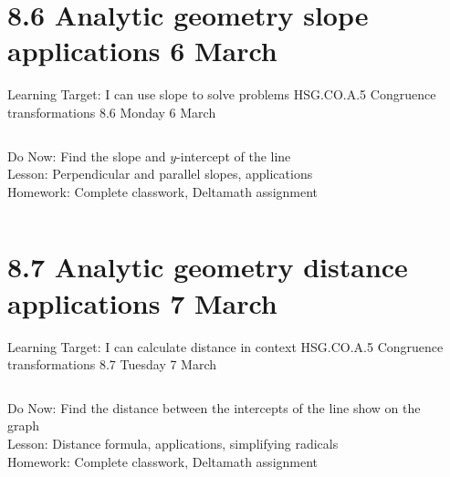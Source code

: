 \section{8.6 Analytic geometry slope applications \hfill 6 March \,}
\begin{frame}{Learning Target: I can use slope to solve problems}
  {HSG.CO.A.5 Congruence transformations \hfill \alert{8.6 Monday 6 March}}
  \begin{columns}
    Do Now: Find the slope and $y$-intercept of the line \\[0.5cm]
    Lesson: Perpendicular and parallel slopes, applications \\
    Homework: Complete classwork, Deltamath assignment
    \begin{flushright}
    \end{flushright}
  \end{columns}
\end{frame}

\section{8.7 Analytic geometry distance applications \hfill 7 March \,}
\begin{frame}{Learning Target: I can calculate distance in context}
  {HSG.CO.A.5 Congruence transformations \hfill \alert{8.7 Tuesday 7 March}}
  \begin{columns}
    Do Now: Find the distance between the intercepts of the line show on the graph \\[0.5cm]
    Lesson: Distance formula, applications, simplifying radicals \\
    Homework: Complete classwork, Deltamath assignment
    \begin{flushright}
    \end{flushright}
  \end{columns}
\end{frame}



